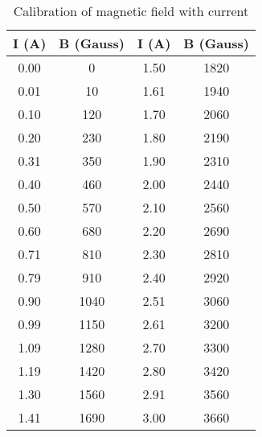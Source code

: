 \begin{table}[H]
    \centering
    \begin{tabular}{|c|c|c|c|}
    \hline
    I (A) & B (Gauss) & I (A) & B (Gauss) \\ \hline
    0.00 & 0 & 1.50 & 1820 \\ \hline
    0.01 & 10 & 1.61 & 1940 \\ \hline
    0.10 & 120 & 1.70 & 2060 \\ \hline
    0.20 & 230 & 1.80 & 2190 \\ \hline
    0.31 & 350 & 1.90 & 2310 \\ \hline
    0.40 & 460 & 2.00 & 2440 \\ \hline
    0.50 & 570 & 2.10 & 2560 \\ \hline
    0.60 & 680 & 2.20 & 2690 \\ \hline
    0.71 & 810 & 2.30 & 2810 \\ \hline
    0.79 & 910 & 2.40 & 2920 \\ \hline
    0.90 & 1040 & 2.51 & 3060 \\ \hline
    0.99 & 1150 & 2.61 & 3200 \\ \hline
    1.09 & 1280 & 2.70 & 3300 \\ \hline
    1.19 & 1420 & 2.80 & 3420 \\ \hline
    1.30 & 1560 & 2.91 & 3560 \\ \hline
    1.41 & 1690 & 3.00 & 3660 \\ \hline
    \end{tabular}
    \caption{Calibration of magnetic field with current}
    \label{tab:cal}
    \end{table}